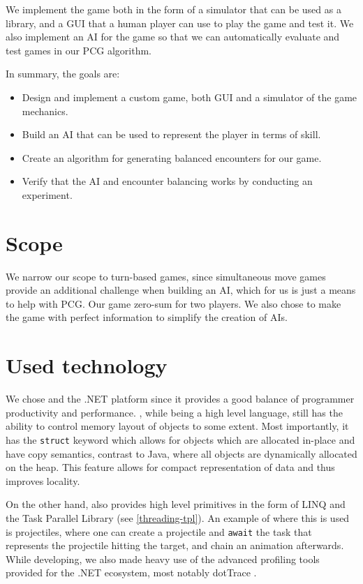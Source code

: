 We implement the game both in the form of a simulator that can be used as a
library, and a GUI that a human player can use to play the game and test it. We
also implement an AI for the game so that we can automatically evaluate and
test games in our PCG algorithm.

In summary, the goals are:

\begin{itemize}
\item Design and implement a custom game, both GUI and a simulator of the game mechanics.
\item Build an AI that can be used to represent the player in terms of skill.
\item Create an algorithm for generating balanced encounters for our game.
\item Verify that the AI and encounter balancing works by conducting an experiment.
\end{itemize}

\section{Scope}

We narrow our scope to turn-based games, since simultaneous move games provide
an additional challenge when building an AI, which for us is just a means to
help with PCG\@. Our game zero-sum for two players. We also chose to make the
game with perfect information to simplify the creation of AIs.

\section{Used technology}

We chose \Csh{} and the .NET platform since it provides a good balance of programmer productivity and performance. \Csh{}, while being a high level language, still has the ability to control memory layout of objects to some extent. Most importantly, it has the \verb|struct| keyword which allows for objects which are allocated in-place and have copy semantics, contrast to Java, where all objects are dynamically allocated on the heap. This feature allows for compact representation of data and thus improves locality.

On the other hand, \Csh{} also provides high level primitives in the form of LINQ and the Task Parallel Library \citep{tpl} (see \autoref{threading-tpl}). An example of where this is used is projectiles, where one can create a projectile and \verb|await| the task that represents the projectile hitting the target, and chain an animation afterwards. While developing, we also made heavy use of the advanced profiling tools provided for the .NET ecosystem, most notably dotTrace \citep{dot-trace}.

